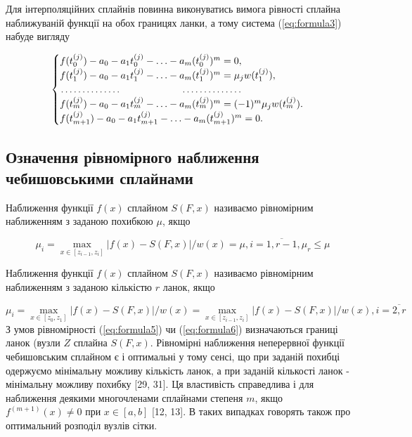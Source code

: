 \documentclass[ukrainian,14pt]{extarticle}
\begin{document}
Для інтерполяційних сплайнів повинна виконуватись вимога рівності сплайна наближуваній функції на обох границях ланки, а тому система (\ref{eq:formula3}) набуде вигляду 

\begin{equation}\label{eq:formula_system7}
\begin{cases}
f(t^{(j)}_0) - a_0 - a_1t^{(j)}_0 - \ldots - a_m(t_0^{(j)})^m = 0, \\
f(t^{(j)}_1)-a_0-a_1t^{(j)}_1 - \ldots - a_m(t^{(j)}_1)^m = \mu_jw(t^{(j)}_1),\\
\dotfill\hfill\hbox{} \dotfill\hfill\hbox{}\\
f(t^{(j)}_{m}) - a_0 - a_1t^{(j)}_{m} - \ldots - a_m(t^{(j)}_{m})^m = (-1)^{m}\mu_jw(t^{(j)}_{m}). \\
f(t^{(j)}_{m+1}) - a_0 - a_1t^{(j)}_{m+1} - \ldots - a_m(t^{(j)}_{m+1})^m = 0.
\end{cases}
\end{equation}

\subsection{Означення рівномірного наближення чебишовськими сплайнами}

Наближення функції $f(x)$ сплайном $S(F, x)$ називаємо рівномірним наближенням з заданою похибкою $\mu$, якщо

\begin{equation}\label{eq:formula5}
\mu_i = \max_{x \in [z_{i-1}, z_i]} |f(x) - S(F, x)|/ w(x) = \mu, i = \overline{1, r-1}, \mu_r \leq \mu
\end{equation}

Наближення функції $f(x)$ сплайном $S(F, x)$ називаємо рівномірним наближенням з заданою кількістю $r$ ланок, якщо

\begin{equation}\label{eq:formula6}
\mu_i = \max_{x \in [z_0, z_1]} |f(x) - S(F, x)|/w(x) = \max_{x \in [z_{i-1}, z_i]} |f(x) - S(F, x)|/w(x), i = \overline{2, r}
\end{equation}
З умов рівномірності (\ref{eq:formula5}) чи (\ref{eq:formula6}) визначаються границі ланок (вузли $Z$ сплайна $S(F, x)$. Рівномірні наближення неперервної функції чебишовським сплайном є і оптимальні у тому сенсі, що при заданій похибці одержуємо мінімальну можливу кількість ланок, а при заданій кількості ланок - мінімальну можливу похибку [29, 31]. Ця властивість справедлива і для наближення деякими многочленами сплайнами степеня $m$, якщо $f^{(m+1)}(x) \neq 0$ при $x \in [a, b]$ [12, 13]. В таких випадках говорять також про оптимальний розподіл вузлів сітки.
\end{document}
